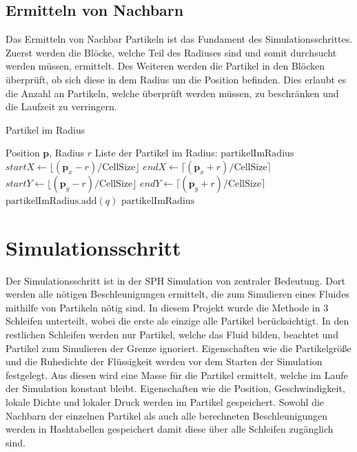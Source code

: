 \documentclass[a4paper, 12pt]{article}
\begin{document}
\subsection{Ermitteln von Nachbarn}
Das Ermitteln von Nachbar Partikeln ist das Fundament des Simulationsschrittes. Zuerst werden die Blöcke, welche Teil des Radiuses sind und somit durchsucht werden müssen, ermittelt. Des Weiteren werden die Partikel in den Blöcken überprüft, ob sich diese in dem Radius um die Position befinden.
Dies erlaubt es die Anzahl an Partikeln, welche überprüft werden müssen, zu beschränken und die Laufzeit zu verringern. 
\begin{algorithm}[H]
    \caption{Partikel im Radius}
    \begin{algorithmic}[1]
		\Require Position $\mathbf{p}$, Radius $r$
        \Ensure Liste der Partikel im Radius: $\text{partikelImRadius}$
        \State $startX \leftarrow \lfloor (\mathbf{p}_x - r) / \text{CellSize} \rfloor$
        \State $endX \leftarrow \lceil (\mathbf{p}_x + r) / \text{CellSize} \rceil$
        \State $startY \leftarrow \lfloor (\mathbf{p}_y - r) / \text{CellSize} \rfloor$
        \State $endY \leftarrow \lceil (\mathbf{p}_y + r) / \text{CellSize} \rceil$
                            \State $\text{partikelImRadius}.\text{add}(q)$
                        \EndIf
                    \EndFor
                \EndIf
            \EndFor
        \EndFor
        \Return $\text{partikelImRadius}$
    \end{algorithmic}
\end{algorithm}

\section{Simulationsschritt} \label{Kap:Simulationsschritt}
Der Simulationsschritt ist in der SPH Simulation von zentraler Bedeutung. Dort werden alle nötigen Beschleunigungen ermittelt, die zum Simulieren eines Fluides mithilfe von Partikeln nötig sind. In diesem Projekt wurde die Methode in 3 Schleifen unterteilt, wobei die erste als einzige alle Partikel berücksichtigt. In den restlichen Schleifen werden nur Partikel, welche das Fluid bilden, beachtet und Partikel zum Simulieren der Grenze ignoriert. Eigenschaften wie die Partikelgröße und die Ruhedichte der Flüssigkeit werden vor dem Starten der Simulation festgelegt. Aus diesen wird eine Masse für die Partikel ermittelt, welche im Laufe der Simulation konstant bleibt. Eigenschaften wie die Position, Geschwindigkeit, lokale Dichte und lokaler Druck werden im Partikel gespeichert. Sowohl die Nachbarn der einzelnen Partikel als auch alle berechneten Beschleunigungen werden in Hashtabellen gespeichert damit diese über alle Schleifen zugänglich sind.
\end{document}
